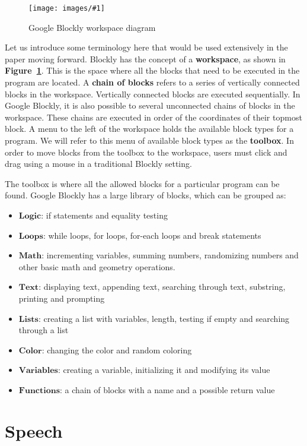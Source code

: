 \documentclass[]{article}
\newcommand\fig[3]{
\begin{figure}
  \begin{center}
  \texttt{[image: images/\#1]}
  \caption{#2} 
  \label{fig:#1}
  \end{center}
\end{figure}
}
\begin{document}
\fig{workspaceDiagram.jpg}{Google Blockly workspace diagram}{width=7cm}

Let us introduce some terminology here that would be used extensively in the
paper moving forward. Blockly has the concept of a \textbf{workspace}, as shown
in \textbf{Figure~\ref{fig:workspaceDiagram.jpg}}. This is the space where all
the blocks that need to be executed in the program are located. A \textbf{chain
  of blocks} refers to a series of vertically connected blocks in the workspace.
Vertically connected blocks are executed sequentially. In Google Blockly, it is
also possible to several unconnected chains of blocks in the workspace. These
chains are executed in order of the coordinates of their topmost block. A menu
to the left of the workspace holds the available block types for a program. We
will refer to this menu of available block types as the \textbf{toolbox}. In
order to move blocks from the toolbox to the workspace, users must click and
drag using a mouse in a traditional Blockly setting.

The toolbox is where all the allowed blocks for a particular program can be found. Google Blockly has a large library of blocks, which can be grouped as:
\begin{itemize}
  \item$\textbf{Logic}$: if statements and equality testing
  \item$\textbf{Loops}$: while loops, for loops, for-each loops and break statements
  \item$\textbf{Math}$: incrementing variables, summing numbers, randomizing numbers and other basic math and geometry operations.
  \item$\textbf{Text}$: displaying text, appending text, searching through text, substring, printing and prompting
  \item$\textbf{Lists}$: creating a list with variables, length, testing if empty and searching through a list
  \item$\textbf{Color}$: changing the color and random coloring
  \item$\textbf{Variables}$: creating a variable, initializing it and modifying its value
  \item$\textbf{Functions}$: a chain of blocks with a name and a possible return value
\end{itemize}

\section{Speech}
\end{document}

